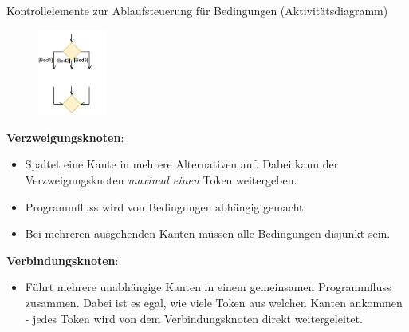 \begin{diag}{Kontrollelemente zur Ablaufsteuerung für Bedingungen (Aktivitätsdiagramm)}
    \begin{figure}
        \centering
        \includegraphics[width=0.2\textwidth]{includes/figures/defi_diagrams_activity_or.pdf}
    \end{figure}
    \textbf{Verzweigungsknoten}:
    \begin{itemize}
        \item Spaltet eine Kante in mehrere Alternativen auf.
              Dabei kann der Verzweigungsknoten \emph{maximal einen} Token weitergeben.
        \item Programmfluss wird von Bedingungen abhängig gemacht.
        \item Bei mehreren ausgehenden Kanten müssen alle Bedingungen disjunkt sein.
    \end{itemize}

    \textbf{Verbindungsknoten}:
    \begin{itemize}
        \item Führt mehrere unabhängige Kanten in einem gemeinsamen Programmfluss zusammen.
              Dabei ist es egal, wie viele Token aus welchen Kanten ankommen - jedes Token wird von dem Verbindungsknoten direkt weitergeleitet.
    \end{itemize}
\end{diag}

